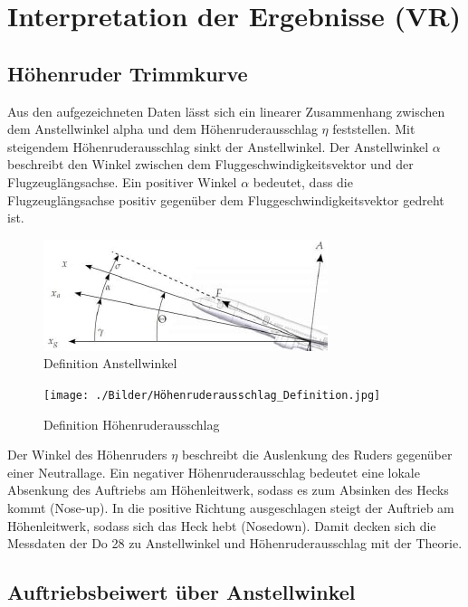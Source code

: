 \chapter{Interpretation der Ergebnisse (VR)}

\section{Höhenruder Trimmkurve}

Aus den aufgezeichneten Daten lässt sich ein linearer Zusammenhang zwischen dem Anstellwinkel alpha und dem 
Höhenruderausschlag $\eta$ feststellen. Mit steigendem Höhenruderausschlag sinkt der Anstellwinkel. 
Der Anstellwinkel $\alpha$ beschreibt den Winkel zwischen dem Fluggeschwindigkeitsvektor und der Flugzeuglängsachse. Ein positiver Winkel $\alpha$ bedeutet, dass die Flugzeuglängsachse positiv gegenüber dem Fluggeschwindigkeitsvektor gedreht ist. 

\begin{figure}[h]
		\includegraphics{./Bilder/Anstellwinkel_Definition.jpg}
	\caption{Definition Anstellwinkel}
	\label{alpha_def}
\end{figure}
\begin{figure}
	\texttt{[image: ./Bilder/Höhenruderausschlag\_Definition.jpg]}
	\caption{Definition Höhenruderausschlag}
	\label{fig:eta_def}
\end{figure}


Der Winkel des Höhenruders $\eta$ beschreibt die Auslenkung des Ruders gegenüber einer Neutrallage. Ein negativer 
Höhenruderausschlag bedeutet eine lokale Absenkung des Auftriebs am Höhenleitwerk, sodass es zum Absinken des Hecks kommt (Nose-up). In die positive Richtung ausgeschlagen steigt der Auftrieb am Höhenleitwerk, sodass sich das Heck hebt (Nosedown). 
Damit decken sich die Messdaten der Do 28 zu Anstellwinkel und Höhenruderausschlag mit der Theorie.




\section{Auftriebsbeiwert über Anstellwinkel}

